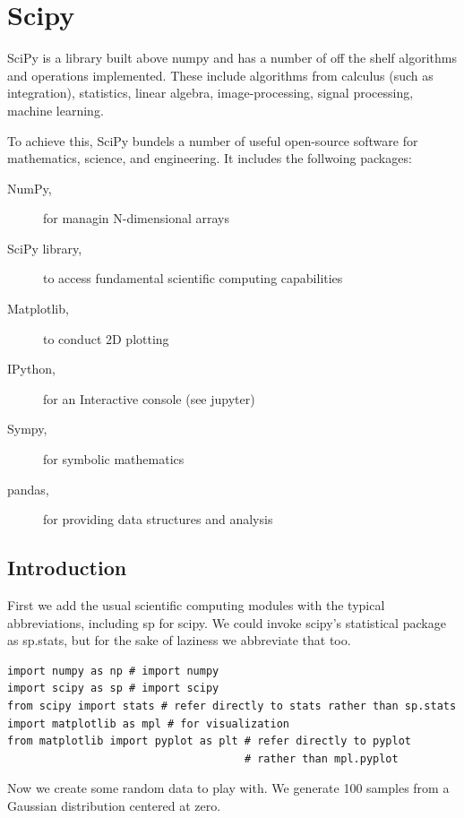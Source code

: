 \chapter{Scipy}
\label{c:scipy}

SciPy is a library built above numpy and has a number of off the shelf
algorithms and operations implemented. These include algorithms from
calculus (such as integration), statistics, linear algebra,
image-processing, signal processing, machine learning.

To achieve this, SciPy bundels a number of useful open-source software
for mathematics, science, and engineering. It includes the follwoing
packages:

\begin{description}

\item[NumPy,] for managin N-dimensional arrays
\item[SciPy library,] to access fundamental scientific computing capabilities
\item[Matplotlib,] to conduct 2D plotting
\item[IPython,] for an Interactive console (see jupyter)
\item[Sympy,] for symbolic mathematics
\item[pandas,] for providing data structures and analysis

\end{description}


\section{Introduction}

First we add the usual scientific computing modules with the typical
abbreviations, including sp for scipy. We could invoke scipy's
statistical package as sp.stats, but for the sake of laziness we
abbreviate that too.

\begin{verbatim}
import numpy as np # import numpy
import scipy as sp # import scipy
from scipy import stats # refer directly to stats rather than sp.stats
import matplotlib as mpl # for visualization
from matplotlib import pyplot as plt # refer directly to pyplot 
                                     # rather than mpl.pyplot
\end{verbatim}

Now we create some random data to play with. We generate 100 samples
from a Gaussian distribution centered at zero.

